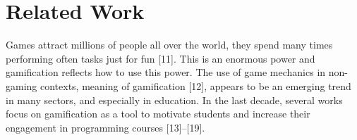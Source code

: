 \section{Related Work}\label{sec:RelatedWork}
Games attract millions of people all over the world, they spend many times performing often tasks just for fun [11]. This is an enormous power and gamification reflects how to use this power. The use of game mechanics in non-gaming contexts, meaning of gamification [12], appears to be an emerging trend in many sectors, and especially in education. In the last decade, several works focus on gamification as a tool to motivate students and increase their engagement in programming courses [13]–[19]. 


